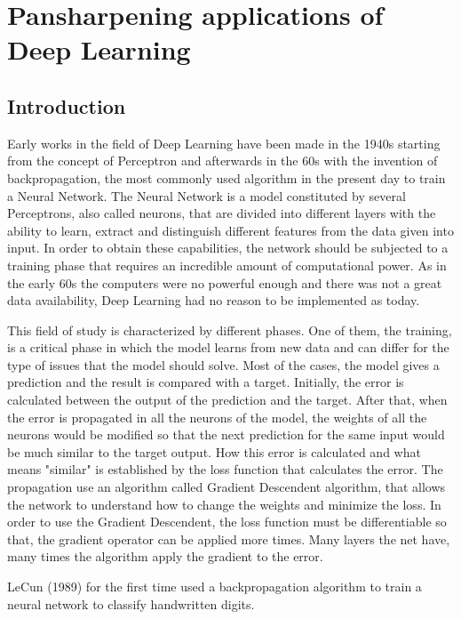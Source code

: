 \documentclass[12pt]{report}
\begin{document}
\newpage

\chapter{Pansharpening applications of Deep Learning}

\section{Introduction}

Early works in the field of Deep Learning have been made in the 1940s starting from the concept of Perceptron \cite{perceptron} and afterwards in the 60s with the invention
of backpropagation, the most commonly used algorithm in the present day to train a Neural Network.
The Neural Network is a model constituted by several Perceptrons, also called neurons, that are divided into different layers with the 
ability to learn, extract and distinguish different features from the data given into input.
In order to obtain these capabilities, the network should be subjected to a training phase that requires an incredible amount of
computational power.
As in the early 60s the computers were no powerful enough and there was not a great data availability,
Deep Learning had no reason to be implemented as today.

This field of study is characterized by different phases.
One of them, the training, is a critical phase in which the model learns from new data and can differ for the type of issues that the model should solve.
Most of the cases, the model gives a prediction and the result is compared with a target. Initially, the error is calculated between the
output of the prediction and the target. After that, when the error is propagated in all the neurons of the model,
the weights of all the neurons would be modified so that the next prediction for the same input would be much similar to the
target output. 
How this error is calculated and what means "similar" is established by the loss function that calculates the error.
The propagation use an algorithm called Gradient Descendent algorithm, that allows the network 
to understand how to change the weights and minimize the loss.
In order to use the Gradient Descendent, the loss function must be differentiable so that,
the gradient operator can be applied more times.
Many layers the net have, many times the algorithm apply the gradient to the error.

LeCun (1989) for the first time used a backpropagation algorithm to train a neural network to classify handwritten digits.
\end{document}
